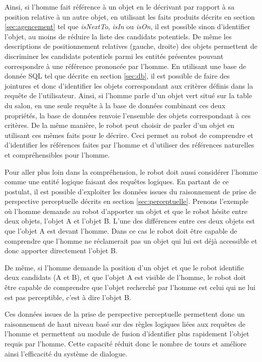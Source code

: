 \documentclass[a4paper,11pt,twoside]{StyleThese}
\begin{document}
Ainsi, si l'homme fait référence à un objet en le décrivant par rapport à sa position relative à un autre objet, en utilisant les faits produits décrits en section \ref{sec:agencement} tel que \textit{isNextTo}, \textit{isIn} ou \textit{isOn}, il est possible sinon d'identifier l'objet, au moins de réduire la liste des candidats potentiels. De même les descriptions de positionnement relatives (gauche, droite) des objets permettent de discriminer les candidats potentiels parmi les entités présentes pouvant correspondre à une référence prononcée par l'homme.
En utilisant une base de donnée SQL tel que décrite en section \ref{sec:db}, il est possible de faire des jointures et donc d'identifier les objets correspondant aux critères définis dans la requête de l'utilisateur.
Ainsi, si l'homme parle d'un objet vert situé sur la table du salon, en une seule requête à la base de données combinant ces deux propriétés, la base de données renvoie l'ensemble des objets correspondant à ces critères.
De la même manière, le robot peut choisir de parler d'un objet en utilisant ces mêmes faits pour le décrire.
Ceci permet au robot de comprendre et d'identifier les références faites par l'homme et d'utiliser des références naturelles et compréhensibles pour l'homme.

Pour aller plus loin dans la compréhension, le robot doit aussi considérer l'homme comme une entité logique faisant des requêtes logiques. En partant de ce postulat, il est possible d'exploiter les données issues du raisonnement de prise de perspective perceptuelle décrits en section \ref{sec:perceptuelle}.
Prenons l'exemple où l'homme demande au robot d'apporter un objet et que le robot hésite entre deux objets, l'objet A et l'objet B. L'une des différences entre ces deux objets est que l'objet A est devant l'homme. Dans ce cas le robot doit être capable de comprendre que l'homme ne réclamerait pas un objet qui lui est déjà accessible et donc apporter directement l'objet B.

De même, si l'homme demande la position d'un objet et que le robot identifie deux candidats (A et B), et que l'objet A est visible de l'homme, le robot doit être capable de comprendre que l'objet recherché par l'homme est celui qui ne lui est pas perceptible, c'est à dire l'objet B.

Ces données issues de la prise de perspective perceptuelle permettent donc un raisonnement de haut niveau basé sur des règles logiques liées aux requêtes de l'homme et permettent au module de fusion d'identifier plus rapidement l'objet requis par l'homme. Cette capacité réduit donc le nombre de tours et améliore ainsi l'efficacité du système de dialogue.
\end{document}
